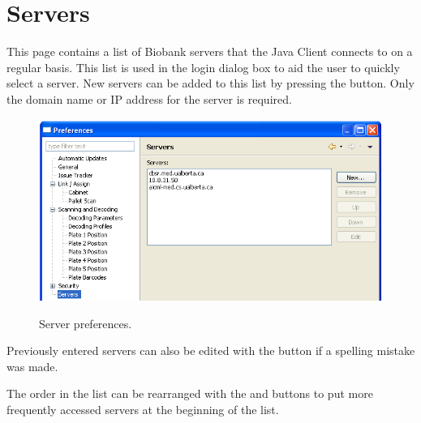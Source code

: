 \section{Servers}
This page contains a list of Biobank servers that the Java Client connects to
on a regular basis. This list is used in the login dialog box to aid the user
to quickly select a server. New servers can be added to this list by pressing
the  button. Only the domain name or IP address for the server is
required.
    \begin{figure}[H]
      \centering
      \scalebox{0.45}
      { \includegraphics*{screenshots/configuration/prefs_servers} }
      \caption{Server preferences.}
      \label{fig:prefs_servers}
    \end{figure}

Previously entered servers can also be edited with the  button if a
spelling mistake was made.

The order in the list can be rearranged with the  and 
buttons to put more frequently accessed servers at the beginning of the list.

